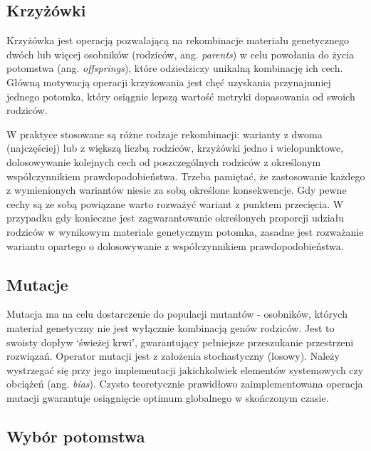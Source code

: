 \documentclass[a4paper,11pt]{article}
\begin{document}
    \subsection{Krzyżówki}

    Krzyżówka jest operacją pozwalającą na rekombinacje materiału genetycznego dwóch lub więcej osobników (rodziców, ang. \textit{parents}) w celu powołania do życia potomstwa (ang. \textit{offsprings}), które odziedziczy unikalną kombinację ich cech. Główną motywacją operacji krzyżowania jest chęć uzyskania przynajmniej jednego potomka, który osiągnie lepszą wartość metryki dopasowania od swoich rodziców\cite{GeneticAlgorithmEssentials2017}.

    \bigskip

    W praktyce stosowane są różne rodzaje rekombinacji: warianty z dwoma (najczęściej) lub z większą liczbą rodziców, krzyżówki jedno i wielopunktowe, dolosowywanie kolejnych cech od poszczególnych rodziców z określonym współczynnikiem prawdopodobieństwa. Trzeba pamiętać, że zastosowanie każdego z wymienionych wariantów niesie za sobą określone konsekwencje. Gdy pewne cechy są ze sobą powiązane warto rozważyć wariant z punktem przecięcia. W przypadku gdy konieczne jest zagwarantowanie określonych proporcji udziału rodziców w wynikowym materiale genetycznym potomka, zasadne jest rozważanie wariantu opartego o dolosowywanie z współczynnikiem prawdopodobieństwa\cite{IntroductionToEvolutionaryComputing2015}.

    \subsection{Mutacje}

    Mutacja ma na celu dostarczenie do populacji mutantów - osobników, których materiał genetyczny nie jest wyłącznie kombinacją genów rodziców. Jest to swoisty dopływ `świeżej krwi', gwarantujący pełniejsze przeszukanie przestrzeni rozwiązań. Operator mutacji jest z założenia stochastyczny (losowy). Należy wystrzegać się przy jego implementacji jakichkolwiek elementów systemowych czy obciążeń (ang. \textit{bias}). Czysto teoretycznie prawidłowo zaimplementowana operacja mutacji gwarantuje osiągnięcie optimum globalnego w skończonym czasie\cite{IntroductionToEvolutionaryComputing2015}.

    \subsection{Wybór potomstwa}
\end{document}
